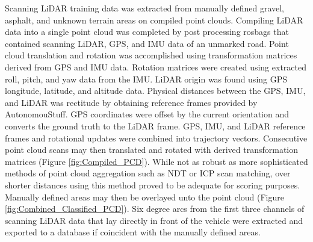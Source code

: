 \documentclass[journal,onecolumn]{IEEEtran}
\begin{document}
	{Scanning LiDAR training data was extracted from manually defined gravel, asphalt, and unknown terrain areas on compiled point clouds. Compiling LiDAR data into a single point cloud was completed by post processing rosbags that contained scanning LiDAR, GPS, and IMU data of an unmarked road. Point cloud translation and rotation was accomplished using transformation matrices derived from GPS and IMU data. Rotation matrices were created using extracted roll, pitch, and yaw data from the IMU. LiDAR origin was found using GPS longitude, latitude, and altitude data. Physical distances between the GPS, IMU, and LiDAR was rectitude by obtaining reference frames provided by AutonomouStuff. GPS coordinates were offset by the current orientation and converts the ground truth to the LiDAR frame. GPS, IMU, and LiDAR reference frames and rotational updates were combined into trajectory vectors. Consecutive point cloud scans may then translated and rotated with derived transformation matrices (Figure \ref{fig:Compiled_PCD}). While not as robust as more sophisticated methods of point cloud aggregation such as NDT or ICP scan matching, over shorter distances using this method proved to be adequate for scoring purposes. Manually defined areas may then be overlayed unto the point cloud (Figure \ref{fig:Combined_Classified_PCD}). Six degree arcs from the first three channels of scanning LiDAR data that lay directly in front of the vehicle were extracted and exported to a database if coincident with the manually defined areas.}
	
\end{document}
